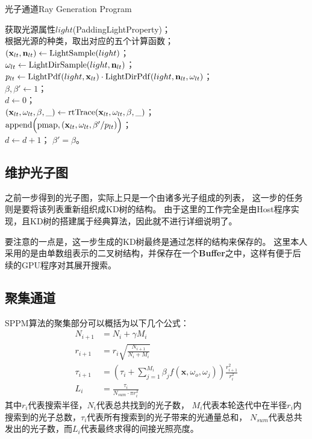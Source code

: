 \begin{algorithm}
    \caption{光子通道Ray Generation Program}
    \label{RGPPPass}

    获取光源属性$light$(PaddingLightProperty)；\\
    根据光源的种类，取出对应的五个计算函数；\\
    $(\textbf{x}_{lt}, \textbf{n}_{lt}) \leftarrow {\rm LightSample}(light)$； \\
    $\omega_{lt} \leftarrow {\rm LightDirSample}(light, \textbf{n}_{lt})$； \\
    $p_{lt} \leftarrow {\rm LightPdf}(light, \textbf{x}_{lt})\cdot {\rm LightDirPdf}(light, \textbf{n}_{lt}, \omega_{lt})$； \\
    $\beta, \beta' \leftarrow 1$；\\    
    $d \leftarrow 0$；\\
    {
        $(\textbf{x}_{lt}, \omega_{lt}, \beta, \_) \leftarrow {\rm rtTrace}(\textbf{x}_{lt}, \omega_{lt}, \beta, \_)$；\\
        {    
            ${\rm append}\Big({\rm pmap}, (\textbf{x}_{lt}, \omega_{lt}, \beta' / p_{lt})\Big)$；\\
            $d \leftarrow d+1$；
        }
        $\beta' = \beta$。
    }

\end{algorithm}

\subsection{维护光子图}
之前一步得到的光子图，实际上只是一个由诸多光子组成的列表，
这一步的任务则是要将该列表重新组织成KD树的结构。
由于这里的工作完全是由Host程序实现，且KD树的搭建属于经典算法，因此就不进行详细说明了。

要注意的一点是，这一步生成的KD树最终是通过怎样的结构来保存的。
这里本人采用的是由单数组表示的二叉树结构，并保存在一个\textbf{Buffer}之中，这样有便于后续的GPU程序对其展开搜索。

\subsection{聚集通道}

SPPM算法的聚集部分可以概括为以下几个公式\cite{StochasticProgressivePhotonMapping}：
\begin{align}
    N_{i+1} &= N_{i}+\gamma M_i \label{SPPM1}\\
    r_{i+1} &= r_i\sqrt{\frac{N_{i+1}}{N_i+M_i}} \label{SPPM2}\\
    \tau_{i+1} &= (\tau_i+\sum_{j = 1}^{M_i}\beta_jf(\textbf{x},\omega_o, \omega_j))\frac{r_{i+1}^2}{r_i^2} \label{SPPM3}\\
    L_i &= \frac{\tau_i}{N_{sum}\cdot \pi r_i^2}  
\end{align}
其中$r_i$代表搜索半径，$N_i$代表总共找到的光子数，
$M_i$代表本轮迭代中在半径$r_i$内搜索到的光子总数，$\tau_i$代表所有搜索到的光子带来的光通量总和，
$N_{sum}$代表总共发出的光子数，而$L_i$代表最终求得的间接光照亮度。

